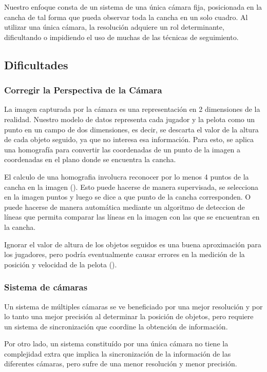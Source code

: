Nuestro enfoque consta de un sistema de una única cámara fija, posicionada en
la cancha de tal forma que pueda observar toda la cancha en un solo cuadro. Al
utilizar una única cámara, la resolución adquiere un rol determinante,
dificultando o impidiendo el uso de muchas de las técnicas de seguimiento.

\subsection{Dificultades}

\subsubsection{Corregir la Perspectiva de la Cámara}

La imagen capturada por la cámara es una representación en 2 dimensiones de
la realidad. Nuestro modelo de datos representa cada jugador y la pelota
como un punto en un campo de dos dimensiones, es decir, se descarta el valor
de la altura de cada objeto seguido, ya que no interesa esa información.
Para esto, se aplica una homografía para convertir las coordenadas de un punto de
la imagen a coordenadas en el plano donde se encuentra la cancha.

El calculo de una homografia involucra reconocer por lo menos 4 puntos de la cancha
en la imagen (\cite{homography-estimation}). Esto puede hacerse de manera supervisada, se selecciona en la imagen
puntos y luego se dice a que punto de la cancha corresponden. O puede hacerse de
manera automática mediante un algoritmo de deteccion de líneas que permita
comparar las líneas en la imagen con las que se encuentran en la cancha.

Ignorar el valor de altura de los objetos seguidos es una buena aproximación
para los jugadores, pero podría eventualmente causar errores en la medición de
la posición y velocidad de la pelota (\cite{Liu20061146}).

\subsubsection{Sistema de cámaras}

Un sistema de múltiples cámaras se ve beneficiado por una mejor resolución y
por lo tanto una mejor precisión al determinar la posición de objetos, pero
requiere un sistema de sincronización que coordine la obtención de información.

Por otro lado, un sistema constituído por una única cámara no tiene la
complejidad extra que implica la sincronización de la información de las
diferentes cámaras, pero sufre de una menor resolución y menor precisión.

